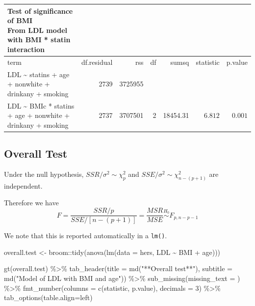 \documentclass[
  letterpaper,
  DIV=11,
  numbers=noendperiod]{scrreport}
\newenvironment{Shaded}{\begin{snugshade}}{\end{snugshade}}
\newcommand{\AttributeTok}[1]{\textcolor[rgb]{0.40,0.45,0.13}{#1}}
\newcommand{\DecValTok}[1]{\textcolor[rgb]{0.68,0.00,0.00}{#1}}
\newcommand{\FunctionTok}[1]{\textcolor[rgb]{0.28,0.35,0.67}{#1}}
\newcommand{\NormalTok}[1]{\textcolor[rgb]{0.00,0.23,0.31}{#1}}
\newcommand{\OtherTok}[1]{\textcolor[rgb]{0.00,0.23,0.31}{#1}}
\newcommand{\SpecialCharTok}[1]{\textcolor[rgb]{0.37,0.37,0.37}{#1}}
\newcommand{\StringTok}[1]{\textcolor[rgb]{0.13,0.47,0.30}{#1}}
\begin{document}
\begin{longtable}{lrrrrrr}
\caption*{
{\large \textbf{Test of significance of BMI}} \\ 
{\small From LDL model with BMI * statin interaction}
} \\ 
\toprule
term & df.residual & rss & df & sumsq & statistic & p.value \\ 
\midrule
LDL \textasciitilde{} statins + age + nonwhite + drinkany + smoking & 2739 & 3725955 &  &  &  &  \\ 
LDL \textasciitilde{} BMIc * statins + age + nonwhite + drinkany + smoking & 2737 & 3707501 & 2 & 18454.31 & $6.812$ & $0.001$ \\ 
\bottomrule
\end{longtable}

\hypertarget{overall-test}{%
\subsection{Overall Test}\label{overall-test}}

Under the null hypothesis, \(SSR/\sigma^2 \sim \chi^2_p\) and
\(SSE/\sigma^2 \sim \chi^2_{n-(p+1)}\) are independent.

Therefore we have
\[F = \frac{SSR/p}{SSE/[n-(p+1)]} = \frac{MSR}{MSE} \stackrel{H_0}{\sim} F_{p,n-p-1}\]

We note that this is reported automatically in a \texttt{lm()}.

\begin{Shaded}
\begin{Highlighting}[]
\NormalTok{overall.test }\OtherTok{\textless{}{-}}\NormalTok{ broom}\SpecialCharTok{::}\FunctionTok{tidy}\NormalTok{(}\FunctionTok{anova}\NormalTok{(}\FunctionTok{lm}\NormalTok{(}\AttributeTok{data =}\NormalTok{ hers, LDL }\SpecialCharTok{\textasciitilde{}}\NormalTok{ BMI }\SpecialCharTok{+}\NormalTok{ age)))}

\FunctionTok{gt}\NormalTok{(overall.test) }\SpecialCharTok{\%\textgreater{}\%} 
  \FunctionTok{tab\_header}\NormalTok{(}\AttributeTok{title =} \FunctionTok{md}\NormalTok{(}\StringTok{"**Overall test**"}\NormalTok{),}
             \AttributeTok{subtitle =} \FunctionTok{md}\NormalTok{(}\StringTok{"Model of LDL with BMI and age"}\NormalTok{)) }\SpecialCharTok{\%\textgreater{}\%} 
  \FunctionTok{sub\_missing}\NormalTok{(}\AttributeTok{missing\_text =} \StringTok{\textquotesingle{}\textquotesingle{}}\NormalTok{) }\SpecialCharTok{\%\textgreater{}\%} 
  \FunctionTok{fmt\_number}\NormalTok{(}\AttributeTok{columns =} \FunctionTok{c}\NormalTok{(}\StringTok{\textquotesingle{}statistic\textquotesingle{}}\NormalTok{, }\StringTok{\textquotesingle{}p.value\textquotesingle{}}\NormalTok{), }\AttributeTok{decimals =} \DecValTok{3}\NormalTok{) }\SpecialCharTok{\%\textgreater{}\%} 
  \FunctionTok{tab\_options}\NormalTok{(}\AttributeTok{table.align=}\StringTok{\textquotesingle{}left\textquotesingle{}}\NormalTok{)}
\end{Highlighting}
\end{Shaded}
\end{document}
